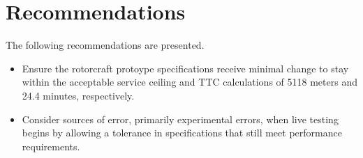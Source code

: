 \documentclass[12pt]{report}
\begin{document}
\section{Recommendations}

The following recommendations are presented.

\begin{itemize}
    \item Ensure the rotorcraft protoype specifications receive minimal change to stay within the acceptable service ceiling and
    TTC calculations of 5118 meters and 24.4 minutes, respectively.
    \item Consider sources of error, primarily experimental errors, when live testing begins by allowing a tolerance in
    specifications that still meet performance requirements.
\end{itemize}


\pagebreak

\raggedright
\begin{singlespace}  %
	\setlength\bibitemsep{\baselineskip}  %
	\printbibliography[title={References}]
\end{singlespace}

 \label{section:references}

\end{document}
